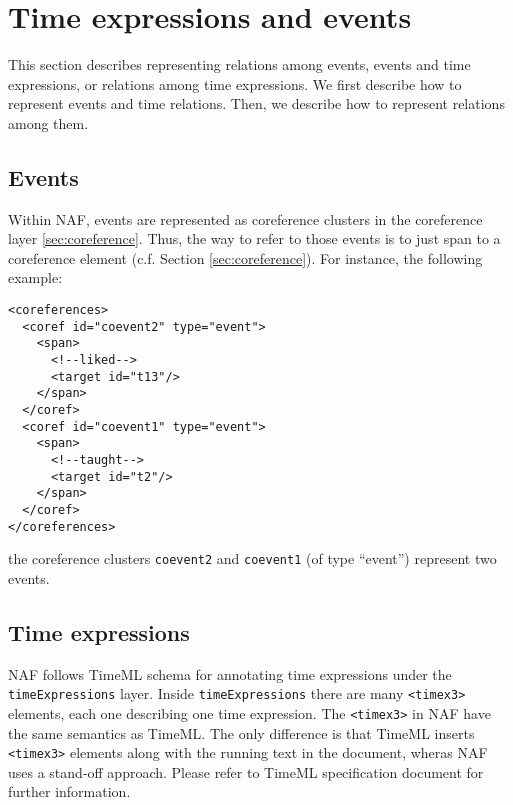 
\section{Time expressions and events}
\label{sec:time-expr-events}

This section describes representing relations among events, events and time
expressions, or relations among time expressions. We first describe how to
represent events and time relations. Then, we describe how to represent
relations among them.

\subsection{Events}
\label{sec:events}

Within NAF, events are represented as coreference clusters in the
coreference layer \ref{sec:coreference}. Thus, the way to refer to those
events is to just span to a coreference element (c.f. Section
\ref{sec:coreference}). For instance, the following example:

\begin{Verbatim}
<coreferences>
  <coref id="coevent2" type="event">
    <span>
      <!--liked-->
      <target id="t13"/>
    </span>
  </coref>
  <coref id="coevent1" type="event">
    <span>
      <!--taught-->
      <target id="t2"/>
    </span>
  </coref>
</coreferences>
\end{Verbatim}

\noindent the coreference clusters \texttt{coevent2} and
\texttt{coevent1} (of type ``event'') represent two events.

\subsection{Time expressions}
\label{sec:time-expressions}

NAF follows TimeML schema for annotating time expressions under the
\texttt{timeExpressions} layer. Inside \texttt{timeExpressions} there are
many \texttt{<timex3>} elements, each one describing one time
expression. The \texttt{<timex3>} in NAF have the same semantics as
TimeML. The only difference is that TimeML inserts \texttt{<timex3>}
elements along with the running text in the document, wheras NAF uses a
stand-off approach. Please refer to TimeML specification document
\cite{isotimeml} for further information.

